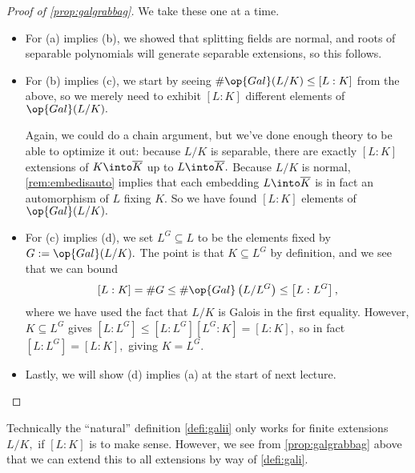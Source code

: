 \begin{proof}[Proof of \autoref{prop:galgrabbag}]
	We take these one at a time.
	\begin{itemize}
		\item For (a) implies (b), we showed that splitting fields are normal, and roots of separable polynomials will generate separable extensions, so this follows.

		\item For (b) implies (c), we start by seeing $\#\op{Gal}(L/K)\le[L:K]$ from the above, so we merely need to exhibit $[L:K]$ different elements of $\op{Gal}(L/K).$
		
		Again, we could do a chain argument, but we've done enough theory to be able to optimize it out: because $L/K$ is separable, there are exactly $[L:K]$ extensions of $K\into\overline K$ up to $L\into\overline K.$ Because $L/K$ is normal, \autoref{rem:embedisauto} implies that each embedding $L\into\overline K$ is in fact an automorphism of $L$ fixing $K.$ So we have found $[L:K]$ elements of $\op{Gal}(L/K).$
		

		\item For (c) implies (d), we set $L^G\subseteq L$ to be the elements fixed by $G:=\op{Gal}(L/K).$ The point is that $K\subseteq L^G$ by definition, and we see that we can bound
		\[[L:K]=\#G\le\#\op{Gal}\left(L/L^G\right)\le\left[L:L^G\right],\]
		where we have used the fact that $L/K$ is Galois in the first equality. However, $K\subseteq L^G$ gives $\left[L:L^G\right]\le\left[L:L^G\right]\left[L^G:K\right]=[L:K],$ so in fact $\left[L:L^G\right]=[L:K],$ giving $K=L^G.$

		\item Lastly, we will show (d) implies (a) at the start of next lecture.
		\qedhere
	\end{itemize}
\end{proof}
\begin{remark}[Nir]
	Technically the ``natural'' definition \autoref{defi:galii} only works for finite extensions $L/K,$ if $[L:K]$ is to make sense. However, we see from \autoref{prop:galgrabbag} above that we can extend this to all extensions by way of \autoref{defi:gali}.
\end{remark}